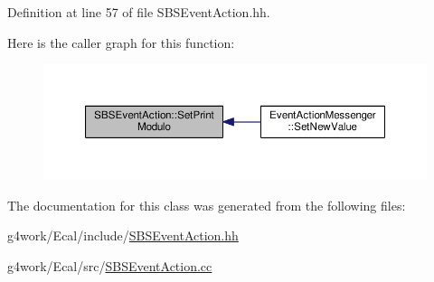 Definition at line 57 of file S\-B\-S\-Event\-Action.\-hh.



Here is the caller graph for this function\-:\nopagebreak
\begin{figure}[H]
\begin{center}
\leavevmode
\includegraphics[width=350pt]{class_s_b_s_event_action_a34c1012298c01158013e5c63108e97d0_icgraph}
\end{center}
\end{figure}




The documentation for this class was generated from the following files\-:\begin{DoxyCompactItemize}
\item 
g4work/\-Ecal/include/\hyperlink{_s_b_s_event_action_8hh}{S\-B\-S\-Event\-Action.\-hh}\item 
g4work/\-Ecal/src/\hyperlink{_s_b_s_event_action_8cc}{S\-B\-S\-Event\-Action.\-cc}\end{DoxyCompactItemize}
